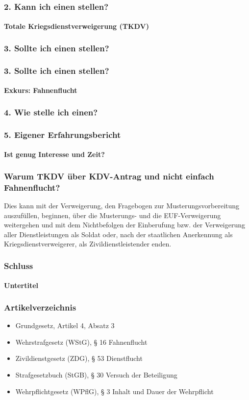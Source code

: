 \documentclass{beamer}
\begin{document}
	\begin{frame}
		\frametitle{2. Kann ich einen stellen?}
	  	\framesubtitle{Totale Kriegsdienstverweigerung (TKDV)}
	  				  			
	\end{frame}
	
	\begin{frame}
		\frametitle{3. Sollte ich einen stellen?}
	\end{frame}
	
	\begin{frame}
		\frametitle{3. Sollte ich einen stellen?}
		\framesubtitle{Exkurs: Fahnenflucht}
	\end{frame}
	
	\begin{frame}
		\frametitle{4. Wie stelle ich einen?}
	\end{frame}

	\begin{frame}
		\frametitle{5. Eigener Erfahrungsbericht}
		\framesubtitle{Ist genug Interesse und Zeit?}
	\end{frame}
	
	\begin{frame}
		\frametitle{Warum TKDV über KDV-Antrag und nicht einfach Fahnenflucht?}
		Dies kann mit der Verweigerung, den Fragebogen zur Musterungsvorbereitung auszufüllen, beginnen, über die Musterungs- und die EUF-Verweigerung weitergehen und mit dem Nichtbefolgen der Einberufung bzw. der Verweigerung aller Dienstleistungen als Soldat oder, nach der staatlichen Anerkennung als Kriegsdienstverweigerer, als Zivildienstleistender enden.
	\end{frame}
	
	\begin{frame}
	 	  	\frametitle{Schluss}	
  		  	\framesubtitle{Untertitel}
	\end{frame}
	
	\begin{frame}
		\frametitle{Artikelverzeichnis}
		\begin{itemize}
			\item Grundgesetz, Artikel 4, Absatz 3
			\item Wehrstrafgesetz (WStG), § 16 Fahnenflucht
			\item Zivildienstgesetz (ZDG), § 53 Dienstflucht
			\item Strafgesetzbuch (StGB), § 30 Versuch der Beteiligung
			\item Wehrpflichtgesetz (WPflG), § 3 Inhalt und Dauer der Wehrpflicht
		\end{itemize}
	\end{frame}
	
\end{document}
